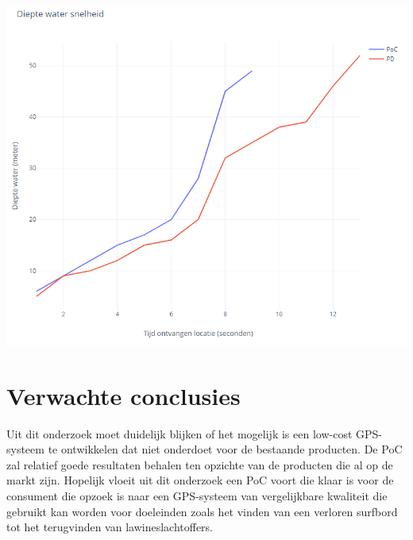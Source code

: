 \includegraphics[width=\textwidth,height=\textheight,keepaspectratio]{waterDepth}
\clearpage
\section{Verwachte conclusies}
\label{sec:verwachte_conclusies}

Uit dit onderzoek moet duidelijk blijken of het mogelijk is een low-cost GPS-systeem te ontwikkelen dat niet onderdoet voor de bestaande producten. De PoC zal relatief goede resultaten behalen ten opzichte van de producten die al op de markt zijn. 
Hopelijk vloeit uit dit onderzoek een PoC voort die klaar is voor de consument die opzoek is naar een GPS-systeem van vergelijkbare kwaliteit die gebruikt kan worden voor doeleinden zoals het vinden van een verloren surfbord tot het terugvinden van lawineslachtoffers.


